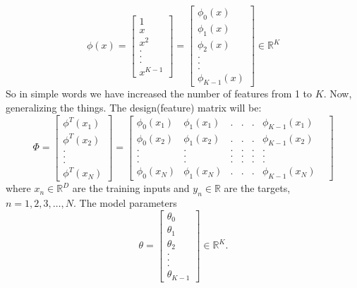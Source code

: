 \documentclass[12pt]{article}
\numberwithin{equation}{section}
\begin{document}
\begin{equation*}
	\phi(x) = \begin{bmatrix}
		1\\ x\\ x^2\\ .\\ .\\ .\\ x^{K-1}
	\end{bmatrix}
= \begin{bmatrix}
	\phi_{0}(x)\\ \phi_{1}(x)\\ \phi_{2}(x)\\ .\\ .\\ .\\ \phi_{K-1}(x)
\end{bmatrix} \in \mathbb{R}^K
\end{equation*}
So in simple words we have increased the number of features from 1 to $K$. Now, generalizing the things. The design(feature) matrix will be:
\begin{equation*}
	\Phi = \begin{bmatrix}
		\phi^T(x_{1})\\ \phi^T(x_{2})\\ .\\ .\\ .\\ \phi^T(x_{N}) 
	\end{bmatrix}
= \begin{bmatrix}
	\phi_{0}(x_{1})& \phi_{1}(x_{1})& .& .& .& \phi_{K-1}(x_{1})\\
	\phi_{0}(x_{2})& \phi_{1}(x_{2})& .& .& .& \phi_{K-1}(x_{2})\\
	.& .& .& .& .& .&\\ 
	.& .& .& .& .& .&\\
	.& .& .& .& .& .&\\
	\phi_{0}(x_{N})& \phi_{1}(x_{N})& .& .& .& \phi_{K-1}(x_{N})
\end{bmatrix}
\end{equation*}
where $x_{n} \in \mathbb{R}^D$ are the training inputs and $y_{n} \in \mathbb{R}$ are the targets, $n=1, 2, 3, \dots, N.$ The model parameters 
$$\theta = \begin{bmatrix}
	\theta_{0}\\ \theta_{1}\\ \theta_{2}\\ .\\ .\\ .\\ \theta_{K-1}
\end{bmatrix} \in \mathbb{R}^K.$$
\end{document}
